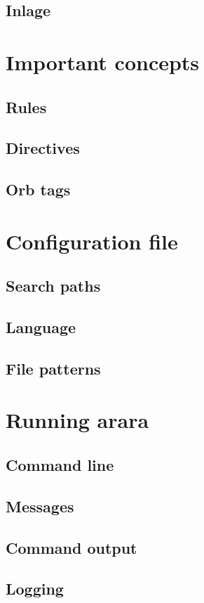 \documentclass[a4paper,twoside,12pt]{memoir}
\begin{document}
\section{Inlage}

\chapter{Important concepts}
\section{Rules}
\section{Directives}
\section{Orb tags}

\chapter{Configuration file}
\section{Search paths}
\section{Language}
\section{File patterns}

\chapter{Running arara}
\section{Command line}
\section{Messages}
\section{Command output}
\section{Logging}
\end{document}
